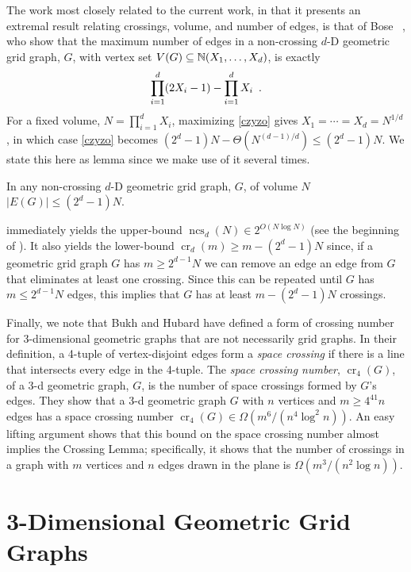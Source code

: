 \documentclass{patmorin}
\newcommand{\n}{N}
\DeclareMathOperator{\crs}{cr}
\DeclareMathOperator{\ncs}{ncs}
\begin{document}
The work most closely related to the current work, in that it presents
an extremal result relating crossings, volume, and number of edges, is
that of Bose \etal~\cite{bose.czyzowicz.ea:maximum}, who show that the
maximum number of edges in a non-crossing $d$-D geometric grid graph,
$G$, with vertex set $V(G)\subseteq \mathbb{N}(X_1,\ldots,X_d)$, is exactly
\begin{equation}
    \prod_{i=1}^d (2X_i-1) - \prod_{i=1}^d X_i \enspace . \eqlabel{czyzo}
\end{equation}
For a fixed volume, $\n=\prod_{i=1}^d X_i$, maximizing \eqref{czyzo} gives
$X_1=\cdots=X_d=\n^{1/d}$, in which case \eqref{czyzo} becomes $(2^d-1)\n -
\Theta(\n^{(d-1)/d})\le (2^d-1)\n$.  We state this here as lemma since we
make use of it several times.
\begin{lem}
  In any non-crossing $d$-D geometric grid graph, $G$, of volume $\n$
  $|E(G)|\le(2^d-1)\n$.
\end{lem}
 immediately yields the upper-bound
$\ncs_d(\n)\in2^{O(\n\log\n)}$ (see the beginning of ).
It also yields the lower-bound $\crs_d(m)\ge m-(2^{d}-1)N$ since, if a
geometric grid graph $G$ has $m\ge 2^{d-1}N$ we can remove an edge an
edge from $G$ that eliminates at least one crossing.  Since this can
be repeated until $G$ has $m\le 2^{d-1}N$ edges, this implies that $G$
has at least $m-(2^d-1)N$ crossings.

Finally, we note that Bukh and Hubard \cite{bukh.hubard:space} have
defined a form of crossing number for 3-dimensional geometric graphs
that are not necessarily grid graphs.  In their definition, a 4-tuple
of vertex-disjoint edges form a \emph{space crossing} if there is
a line that intersects every edge in the 4-tuple.  The \emph{space
crossing number}, $\crs_4(G)$, of a 3-d geometric graph, $G$, is the
number of space crossings formed by $G$'s edges.  They show that a
3-d geometric graph $G$ with $n$ vertices and $m\ge 4^{41}n$ edges
has a space crossing number $\crs_4(G) \in \Omega(m^6/(n^4\log^2 n))$.
An easy lifting argument shows that this bound on the space crossing
number almost implies the Crossing Lemma; specifically, it shows that
the number of crossings in a graph with $m$ vertices and $n$ edges drawn
in the plane is $\Omega(m^3/(n^2\log n))$.

\section{3-Dimensional Geometric Grid Graphs}
\end{document}
